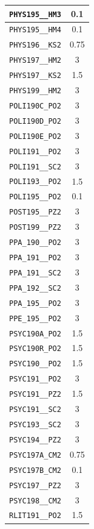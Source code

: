 \begin{longtable}{|p{}|c|}
    \verb|PHYS195__HM3| & 0.1\\\hline
    \verb|PHYS195__HM4| & 0.1\\\hline
    \verb|PHYS196__KS2| & 0.75\\\hline
    \verb|PHYS197__HM2| & 3\\\hline
    \verb|PHYS197__KS2| & 1.5\\\hline
    \verb|PHYS199__HM2| & 3\\\hline
    \verb|POLI190C_PO2| & 3\\\hline
    \verb|POLI190D_PO2| & 3\\\hline
    \verb|POLI190E_PO2| & 3\\\hline
    \verb|POLI191__PO2| & 3\\\hline
    \verb|POLI191__SC2| & 3\\\hline
    \verb|POLI193__PO2| & 1.5\\\hline
    \verb|POLI195__PO2| & 0.1\\\hline
    \verb|POST195__PZ2| & 3\\\hline
    \verb|POST199__PZ2| & 3\\\hline
    \verb|PPA_190__PO2| & 3\\\hline
    \verb|PPA_191__PO2| & 3\\\hline
    \verb|PPA_191__SC2| & 3\\\hline
    \verb|PPA_192__SC2| & 3\\\hline
    \verb|PPA_195__PO2| & 3\\\hline
    \verb|PPE_195__PO2| & 3\\\hline
    \verb|PSYC190A_PO2| & 1.5\\\hline
    \verb|PSYC190R_PO2| & 1.5\\\hline
    \verb|PSYC190__PO2| & 1.5\\\hline
    \verb|PSYC191__PO2| & 3\\\hline
    \verb|PSYC191__PZ2| & 1.5\\\hline
    \verb|PSYC191__SC2| & 3\\\hline
    \verb|PSYC193__SC2| & 3\\\hline
    \verb|PSYC194__PZ2| & 3\\\hline
    \verb|PSYC197A_CM2| & 0.75\\\hline
    \verb|PSYC197B_CM2| & 0.1\\\hline
    \verb|PSYC197__PZ2| & 3\\\hline
    \verb|PSYC198__CM2| & 3\\\hline
    \verb|RLIT191__PO2| & 1.5\\\hline

\end{longtable}
